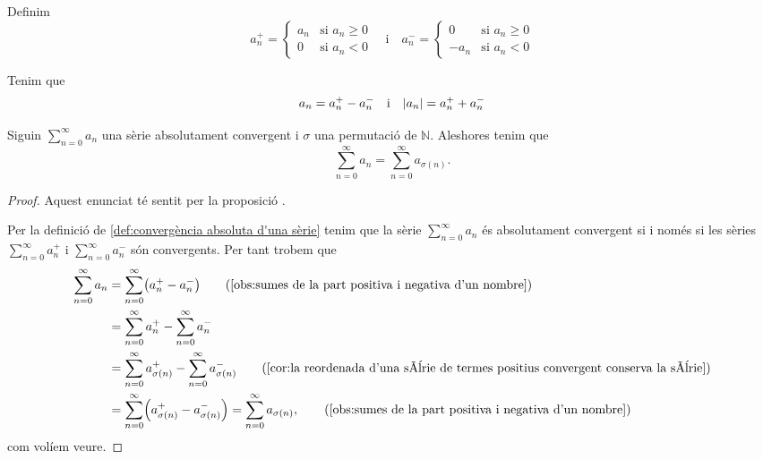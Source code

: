 \documentclass[../../Main.tex]{subfiles}
\begin{document}
	\begin{notation}
		\label{notation:part positiva d'un nombre}
		\label{notation:part negativa d'un nombre}
		Definim
		\[a^{+}_{n}=\begin{cases}
			a_{n} & \text{si }a_{n}\geq0 \\
			0 & \text{si }a_{n}<0
		\end{cases}\quad\text{i}\quad
		a^{-}_{n}=\begin{cases}
			0 & \text{si }a_{n}\geq0 \\
			-a_{n} & \text{si }a_{n}<0
		\end{cases}\]
	\end{notation}
	\begin{observation}
		\label{obs:sumes de la part positiva i negativa d'un nombre}
		Tenim que
		\[a_{n}=a^{+}_{n}-a^{-}_{n}\quad\text{i}\quad\abs{a_{n}}=a^{+}_{n}+a^{-}_{n}\]
	\end{observation}
	\begin{lemma}
		Siguin \(\sum_{n=0}^{\infty}a_{n}\) una sèrie absolutament convergent i \(\sigma\) una permutació de \(\mathbb{N}\). Aleshores tenim que
		\[\sum_{n=0}^{\infty}a_{n}=\sum_{n=0}^{\infty}a_{\sigma(n)}.\]
		\begin{proof}
			Aquest enunciat té sentit per la proposició .
			
			Per la definició de \ref{def:convergència absoluta d'una sèrie} tenim que la sèrie \(\sum_{n=0}^{\infty}a_{n}\) és absolutament convergent si i només si les sèries \(\sum_{n=0}^{\infty}a^{+}_{n}\) i \(\sum_{n=0}^{\infty}a^{-}_{n}\) són convergents. Per tant trobem que
			\begin{align*}
				\sum_{n=0}^{\infty}a_{n}&=\sum_{n=0}^{\infty}\left(a^{+}_{n}-a^{-}_{n}\right) \tag{\ref{obs:sumes de la part positiva i negativa d'un nombre}}\\
				&=\sum_{n=0}^{\infty}a^{+}_{n}-\sum_{n=0}^{\infty}a^{-}_{n} \\
				&=\sum_{n=0}^{\infty}a^{+}_{\sigma(n)}-\sum_{n=0}^{\infty}a^{-}_{\sigma(n)} \tag{\ref{cor:la reordenada d'una sèrie de termes positius convergent conserva la sèrie}}\\
				&=\sum_{n=0}^{\infty}\left(a^{+}_{\sigma(n)}-a^{-}_{\sigma(n)}\right)=\sum_{n=0}^{\infty}a_{\sigma(n)}, \tag{\ref{obs:sumes de la part positiva i negativa d'un nombre}}
			\end{align*}
			com volíem veure.
		\end{proof}
	\end{lemma}
\end{document}
